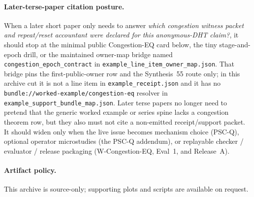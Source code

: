\documentclass[11pt]{article}
\theoremstyle{definition}
\theoremstyle{remark}
\begin{document}
\paragraph{Later-terse-paper citation posture.}
When a later short paper only needs to answer \emph{which congestion witness packet and repeat/reset accountant were declared for this anonymous-DHT claim?}, it should stop at the minimal public Congestion-EQ card below, the tiny stage-and-epoch drill, or the maintained owner-map bridge named \nolinkurl{congestion\_epoch\_contract} in \nolinkurl{example\_line\_item\_owner\_map.json}. That bridge pins the first-public-owner row and the Synthesis~55 route only; in this archive cut it is not a line item in \nolinkurl{example\_receipt.json} and it has no \nolinkurl{bundle://worked-example/congestion-eq} resolver in \nolinkurl{example\_support\_bundle\_map.json}. Later terse papers no longer need to pretend that the generic worked example or series spine lacks a congestion theorem row, but they also must not cite a non-emitted receipt/support packet. It should widen only when the live issue becomes mechanism choice (PSC-Q), optional operator microstudies (the PSC-Q addendum), or replayable checker / evaluator / release packaging (W-Congestion-EQ, Eval~1, and Release~A).\cite{series:workedexample,series:seriesspines,series:pscq,series:pscqaddendum,series:wcongeq,series:evalnotary,anondht_release_receipts}

\paragraph{Artifact policy.}
This archive is source-only; supporting plots and scripts are available on request.\cite{series:artifactpolicy}
\end{document}
